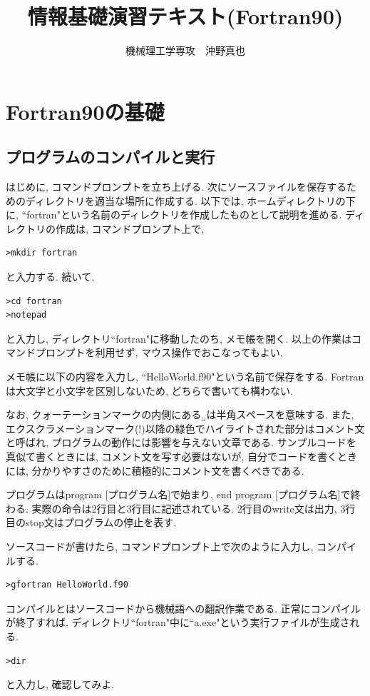 \documentclass[a4j]{jsarticle}
\begin{document}
\title{情報基礎演習テキスト(Fortran90)}
\author{機械理工学専攻　沖野真也}
\date{}
\maketitle

\section{Fortran90の基礎}

\subsection{プログラムのコンパイルと実行}
はじめに, コマンドプロンプトを立ち上げる. 
次にソースファイルを保存するためのディレクトリを適当な場所に作成する. 
以下では, ホームディレクトリの下に, ``fortran"という名前のディレクトリを作成したものとして説明を進める. 
ディレクトリの作成は, コマンドプロンプト上で, 
\begin{Verbatim}[frame=single]
>mkdir fortran
\end{Verbatim}
と入力する. 続いて, 
\begin{Verbatim}[frame=single]
>cd fortran
>notepad
\end{Verbatim}
と入力し, ディレクトリ``fortran"に移動したのち, メモ帳を開く. 
以上の作業はコマンドプロンプトを利用せず, マウス操作でおこなってもよい. 

メモ帳に以下の内容を入力し, ``HelloWorld.f90"という名前で保存をする. 
Fortranは大文字と小文字を区別しないため, どちらで書いても構わない. 

なお, クォーテーションマークの内側にある$_{\sqcup}$は半角スペースを意味する. 
また, エクスクラメーションマーク(!)以降の緑色でハイライトされた部分はコメント文と呼ばれ, 
プログラムの動作には影響を与えない文章である. 
サンプルコードを真似て書くときには, コメント文を写す必要はないが, 
自分でコードを書くときには, 分かりやすさのために積極的にコメント文を書くべきである. 

プログラムはprogram [プログラム名]で始まり, end program [プログラム名]で終わる. 
実際の命令は2行目と3行目に記述されている. 
2行目のwrite文は出力, 3行目のstop文はプログラムの停止を表す. 


ソースコードが書けたら, コマンドプロンプト上で次のように入力し, コンパイルする. 
\begin{Verbatim}[frame=single]
>gfortran HelloWorld.f90
\end{Verbatim}
コンパイルとはソースコードから機械語への翻訳作業である. 
正常にコンパイルが終了すれば, ディレクトリ``fortran"中に``a.exe"という実行ファイルが生成される. 
\begin{Verbatim}[frame=single]
>dir
\end{Verbatim}
と入力し, 確認してみよ. 
\end{document}
